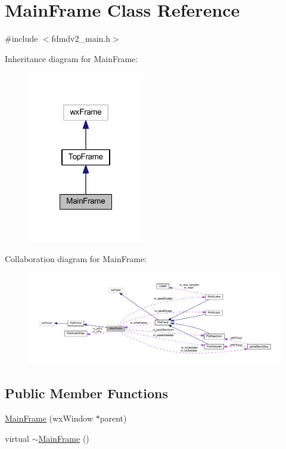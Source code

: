 \hypertarget{class_main_frame}{\section{Main\-Frame Class Reference}
\label{class_main_frame}
}


{\ttfamily \#include $<$fdmdv2\-\_\-main.\-h$>$}



Inheritance diagram for Main\-Frame\-:\nopagebreak
\begin{figure}[H]
\begin{center}
\leavevmode
\includegraphics[width=144pt]{class_main_frame__inherit__graph}
\end{center}
\end{figure}


Collaboration diagram for Main\-Frame\-:
\nopagebreak
\begin{figure}[H]
\begin{center}
\leavevmode
\includegraphics[width=350pt]{class_main_frame__coll__graph}
\end{center}
\end{figure}
\subsection*{Public Member Functions}
\begin{DoxyCompactItemize}
\item 
\hyperlink{class_main_frame_a394b51dbf31b7430ecad3f6ee1007e22}{Main\-Frame} (wx\-Window $\ast$parent)
\item 
virtual \hyperlink{class_main_frame_a0cfd88ece4836e0ea5430bd55370bf11}{$\sim$\-Main\-Frame} ()
\end{DoxyCompactItemize}
